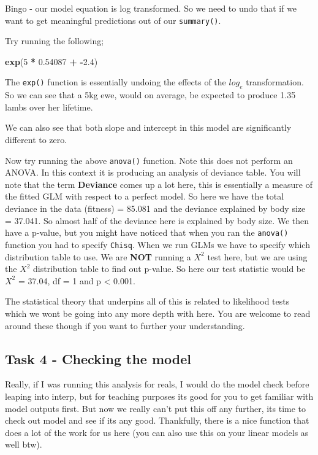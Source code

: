 \documentclass[
]{book}
\newenvironment{Shaded}{\begin{snugshade}}{\end{snugshade}}
\newcommand{\DecValTok}[1]{\textcolor[rgb]{0.00,0.00,0.81}{#1}}
\newcommand{\FloatTok}[1]{\textcolor[rgb]{0.00,0.00,0.81}{#1}}
\newcommand{\FunctionTok}[1]{\textcolor[rgb]{0.13,0.29,0.53}{\textbf{#1}}}
\newcommand{\NormalTok}[1]{#1}
\newcommand{\SpecialCharTok}[1]{\textcolor[rgb]{0.81,0.36,0.00}{\textbf{#1}}}
\begin{document}
Bingo - our model equation is log transformed. So we need to undo that if we want to get meaningful predictions out of our \texttt{summary()}.

Try running the following;

\begin{Shaded}
\begin{Highlighting}[]
\FunctionTok{exp}\NormalTok{(}\DecValTok{5} \SpecialCharTok{*} \FloatTok{0.54087} \SpecialCharTok{+} \SpecialCharTok{{-}}\FloatTok{2.4}\NormalTok{)}
\end{Highlighting}
\end{Shaded}

The \texttt{exp()} function is essentially undoing the effects of the \(log_e\) transformation. So we can see that a 5kg ewe, would on average, be expected to produce 1.35 lambs over her lifetime.

We can also see that both slope and intercept in this model are significantly different to zero.

Now try running the above \texttt{anova()} function. Note this does not perform an ANOVA. In this context it is producing an analysis of deviance table. You will note that the term \textbf{Deviance} comes up a lot here, this is essentially a measure of the fitted GLM with respect to a perfect model. So here we have the total deviance in the data (fitness) = 85.081 and the deviance explained by body size = 37.041. So almost half of the deviance here is explained by body size. We then have a p-value, but you might have noticed that when you ran the \texttt{anova()} function you had to specify \texttt{Chisq}. When we run GLMs we have to specify which distribution table to use. We are \textbf{NOT} running a \(X^2\) test here, but we are using the \(X^2\) distribution table to find out p-value. So here our test statistic would be \(X^2\) = 37.04, df = 1 and p \textless{} 0.001.

The statistical theory that underpins all of this is related to likelihood tests which we wont be going into any more depth with here. You are welcome to read around these though if you want to further your understanding.

\hypertarget{task-4---checking-the-model}{%
\subsection{Task 4 - Checking the model}\label{task-4---checking-the-model}}

Really, if I was running this analysis for reals, I would do the model check before leaping into interp, but for teaching purposes its good for you to get familiar with model outputs first. But now we really can't put this off any further, its time to check out model and see if its any good. Thankfully, there is a nice function that does a lot of the work for us here (you can also use this on your linear models as well btw).
\end{document}
